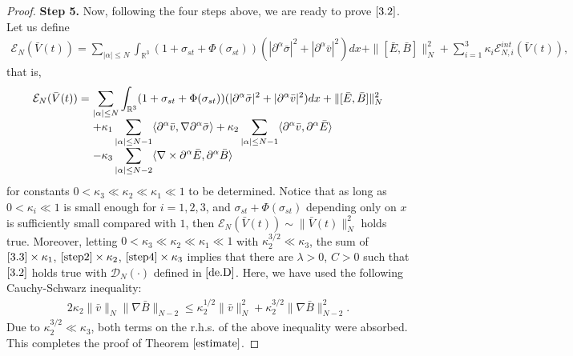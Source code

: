 \documentclass[11pt]{amsart}
\numberwithin{equation}{section}
\begin{document}
\begin{proof}
 \textbf{Step 5.} Now, following the four steps above, we are ready to prove
 $\eqref{3.2}$. Let us define
\begin{eqnarray*}
   \mathcal {E}_{N}(\bar{V}(t))=\sum_{|\alpha|\leq
N}\int_{\mathbb{R}^3}(1+\sigma_{st}+\Phi(\sigma_{st}))
(|\partial^{\alpha}\bar{\sigma}|^2+|\partial^{\alpha}\bar{v}|^2)dx+\|[\bar{E},\bar{B}]\|_{N}^{2}
   +\sum_{i=1}^{3}\kappa_{i}\mathcal {E}^{int}_{N,i}(\bar{V}(t)),
\end{eqnarray*}
that is,
\begin{equation}\label{3.12}
\arraycolsep=1.5pt
\begin{array}{rl}
\mathcal{E}_{N}(\bar{V}(t))=&\displaystyle\sum_{|\alpha|\leq
N}\int_{\mathbb{R}^3}(1+\sigma_{st}+\Phi(\sigma_{st}))
(|\partial^{\alpha}\bar{\sigma}|^2+|\partial^{\alpha}\bar{v}|^2)dx+\|[\bar{E},\bar{B}]\|_{N}^{2}\\[3mm]
&\displaystyle+\kappa_{1}\sum_{|\alpha|\leq N-1} \langle
\partial^{\alpha}\bar{v},\nabla\partial^{\alpha}\bar{\sigma}\rangle+\kappa_{2}\sum_{|\alpha|\leq N-1}\langle
\partial^{\alpha}\bar{v},\partial^{\alpha}\bar{E}\rangle\\[3mm]
&\displaystyle-\kappa_{3}\sum_{|\alpha|\leq N-2}\langle \nabla
\times
\partial^{\alpha}\bar{E},\partial^{\alpha}\bar{B}\rangle
\end{array}
\end{equation}
for constants $0<\kappa_{3}\ll\kappa_{2}\ll\kappa_{1}\ll 1$ to be
determined. Notice that as long as $ 0<\kappa_{i}\ll 1$ is small
enough for $i=1,2,3$, and $\sigma_{st}+\Phi(\sigma_{st}) $ depending
only on $ x$ is sufficiently small compared with $1$, then
$\mathcal{E}_{N}(\bar{V}(t))\sim \|\bar{V}(t)\|^{2}_{N}$ holds true.
Moreover, letting $0<\kappa_{3}\ll\kappa_{2}\ll\kappa_{1}\ll 1$ with
$\kappa_{2}^{3/2}\ll\kappa_{3}$, the sum of $\eqref{3.3}\times
\kappa_{1}$, $\eqref{step2}\times \kappa_{2}$, $\eqref{step4}\times
\kappa_{3}$ implies that there are $\lambda>0$, $C>0$ such that
$\eqref{3.2}$ holds true with $\mathcal {D}_{N}(\cdot)$ defined in
$\eqref{de.D}$. Here, we have used the following Cauchy-Schwarz
inequality:
\begin{eqnarray*}
   2 \kappa_{2} \|\bar{v}\|_{N}\|\nabla \bar {B}\|_{N-2}\leq
   \kappa_{2}^{1/2}\|\bar{v}\|_{N}^{2}+\kappa_{2}^{3/2}\|\nabla\bar{B}\|^{2}_{N-2}.
\end{eqnarray*}
Due to $\kappa_{2}^{3/2}\ll \kappa_{3}$, both terms on the r.h.s. of
the above inequality were absorbed. This completes the proof of
Theorem $\ref{estimate}$.
\end{proof}
\end{document}
